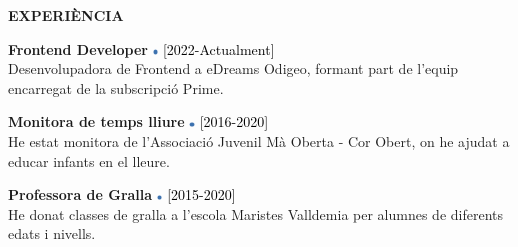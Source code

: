 \documentclass[../main.tex]{subfiles}
\begin{document}
    \vspace*{0.5cm}
    \textbf{\textcolor{myCV2}{EXPERIÈNCIA\underline{\hspace{7.1cm}}}}
        \vspace*{0.3cm}
        
        \textbf{Frontend Developer}
        \includegraphics[width=0.15cm]{assets/full.png} 
        \textcolor{black}{[2022-Actualment]}\\
        Desenvolupadora de Frontend a eDreams Odigeo, formant part de l'equip encarregat de la subscripció Prime.

        \vspace*{0.25cm}
        \textbf{Monitora de temps lliure}
        \includegraphics[width=0.15cm]{assets/full.png}
        \textcolor{black}{[2016-2020]}\\
        He estat monitora de l'Associació Juvenil Mà Oberta - Cor Obert, on he ajudat a educar infants en el lleure.
        
        \vspace*{0.25cm}
        \textbf{Professora de Gralla}
        \includegraphics[width=0.15cm]{assets/full.png}
        \textcolor{black}{[2015-2020]} \\
        He donat classes de gralla a l'escola Maristes Valldemia per alumnes de diferents edats i nivells.
        

\end{document}
